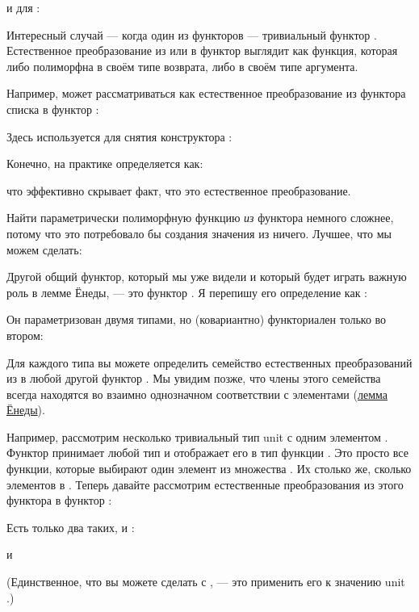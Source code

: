 и для :

Интересный случай --- когда один из функторов --- тривиальный
функтор . Естественное преобразование из или в
функтор  выглядит как функция, которая либо
полиморфна в своём типе возврата, либо в своём типе аргумента.

Например,  может рассматриваться как естественное
преобразование из функтора списка в функтор :

Здесь  используется для снятия конструктора :

Конечно, на практике  определяется как:

что эффективно скрывает факт, что это естественное преобразование.

Найти параметрически полиморфную функцию \emph{из}
функтора  немного сложнее, потому что это потребовало бы
создания значения из ничего. Лучшее, что мы можем сделать:

Другой общий функтор, который мы уже видели и который будет играть
важную роль в лемме Ёнеды, --- это функтор . Я
перепишу его определение как :

Он параметризован двумя типами, но (ковариантно) функториален только
во втором:

Для каждого типа  вы можете определить семейство естественных
преобразований из  в любой другой функтор .
Мы увидим позже, что члены этого семейства всегда находятся во взаимно однозначном
соответствии с элементами 
(\hyperref[the-yoneda-lemma]{лемма Ёнеды}).

Например, рассмотрим несколько тривиальный тип unit \code{()} с
одним элементом \code{()}. Функтор  принимает любой тип
 и отображает его в тип функции .
Это просто все функции, которые выбирают один элемент из множества
. Их столько же, сколько элементов в
. Теперь давайте рассмотрим естественные преобразования из этого функтора
в функтор :

Есть только два таких,  и :

и

(Единственное, что вы можете сделать с , --- это применить его к значению
unit \code{()}.)


